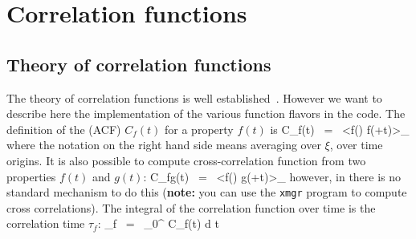 
\section{Correlation functions}
\label{sec:corr}

\subsection{Theory of correlation functions}
The theory of correlation functions is well established~\cite{Allen87}.
However we want to describe here the implementation of the various 
 function flavors in the {\gromacs} code.
The definition of the  (ACF)
$C_f(t)$ for a property $f(t)$ is
\beq
C_f(t)	~=~	\left<f(\xi) f(\xi+t)\right>_{\xi}
\label{eqn:corr}
\eeq
where the notation on the right hand side means averaging over $\xi$, {\ie} over
time origins.
It is also possible to compute cross-correlation function from two properties
$f(t)$ and $g(t)$:
\beq
C_{fg}(t) ~=~ 	\left<f(\xi) g(\xi+t)\right>_{\xi}
\eeq
however, in {\gromacs} there is no standard mechanism to do this
({\bf note:} you can use the {\tt xmgr} program to compute cross correlations).
The integral of the correlation function over time is the 
correlation time $\tau_f$:
\beq
\tau_f	~=~	\int_0^{\infty} C_f(t) {\rm d} t
\label{eqn:corrtime}
\eeq

